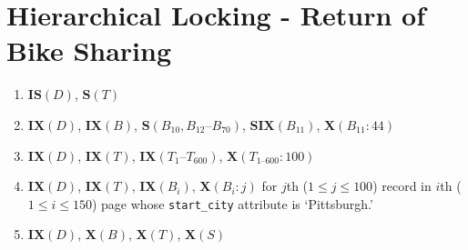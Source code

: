 \documentclass{homework}
\begin{document}
\section{Hierarchical Locking - Return of Bike Sharing}

\begin{enumerate}
    \item $\mathbf{IS}(D)$, $\mathbf{S}(T)$
    \item $\mathbf{IX}(D)$, $\mathbf{IX}(B)$, $\mathbf{S}(B_{10}, B_{12}\textrm{--}B_{70})$, $\mathbf{SIX}(B_{11})$, $\mathbf{X}(B_{11}:44)$
    \item $\mathbf{IX}(D)$, $\mathbf{IX}(T)$, $\mathbf{IX}(T_1\textrm{--}T_{600})$, $\mathbf{X}(T_{1\textrm{--}600}:100)$
    \item $\mathbf{IX}(D)$, $\mathbf{IX}(T)$, $\mathbf{IX}(B_i)$, $\mathbf{X}(B_i: j)$ for $j$th ($1 \le j \le 100$) record in $i$th ($1 \le i \le 150$) page whose \texttt{start\_city} attribute is `Pittsburgh.'
    \item $\mathbf{IX}(D)$, $\mathbf{X}(B)$, $\mathbf{X}(T)$, $\mathbf{X}(S)$
\end{enumerate}
\end{document}
